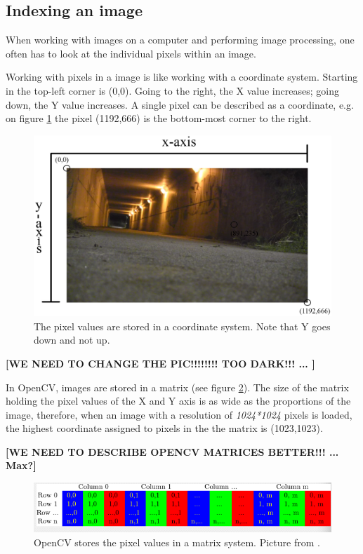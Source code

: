 \subsection{Indexing an image}
When working with images on a computer and performing image processing, one often has to look at the individual pixels within an image.

Working with pixels in a image is like working with a coordinate system. Starting in the top-left corner is (0,0). Going to the right, the X value increases; going down, the Y value increases. A single pixel can be described as a coordinate, e.g. on figure \ref{fig:ip_IndexingAPicture} the pixel (1192,666) is the bottom-most corner to the right.

\begin{figure}[htbp]
\centering
\includegraphics[width=1.00\textwidth]{Pictures/Theory/IndexingAPicture}
\caption{The pixel values are stored in a coordinate system. Note that Y goes down and not up.}
\label{fig:ip_IndexingAPicture}
\end{figure}

\textbf{[WE NEED TO CHANGE THE PIC!!!!!!!! TOO DARK!!! ... ]}

In OpenCV, images are stored in a matrix (see figure \ref{fig:opencv_matrix}). The size of the matrix holding the pixel values of the X and Y axis is as wide as the proportions of the image, therefore, when an image with a resolution of \textit{1024*1024} pixels is loaded, the highest coordinate assigned to pixels in the the matrix is (1023,1023).

\textbf{[WE NEED TO DESCRIBE OPENCV MATRICES BETTER!!! ... Max?]}

\begin{figure}[htbp]
\centering
\includegraphics[width=1.00\textwidth]{Pictures/Theory/opencv_matrix}
\caption{OpenCV stores the pixel values in a matrix system. Picture from \citep{opencv}.}
\label{fig:opencv_matrix}
\end{figure} 

